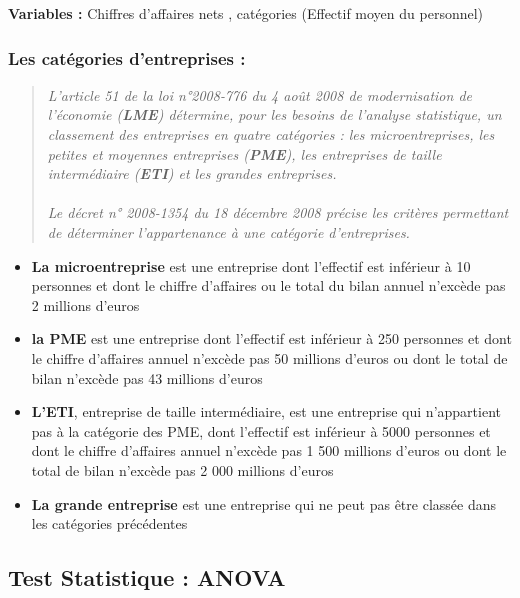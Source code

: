 \documentclass[mstat,12pt]{unswthesis}
\begin{document}
\textbf{Variables :} Chiffres d'affaires nets , catégories (Effectif
moyen du personnel)

\subsubsection{Les catégories d'entreprises
:}\label{les-catuxe9gories-dentreprises}

\bigskip
\scriptsize
\begin{quote}
\textit{L’article 51 de la loi n°2008-776 du 4 août 2008 de modernisation de l’économie (\textbf{LME}) détermine, pour les besoins de l’analyse statistique, un classement des entreprises en quatre catégories : les microentreprises, les petites et moyennes entreprises (\textbf{PME}), les entreprises de taille intermédiaire (\textbf{ETI}) et les grandes entreprises.\\ \\Le décret n° 2008-1354 du 18 décembre 2008 précise les critères permettant de déterminer l’appartenance à une catégorie d'entreprises.}
\end{quote}
\normalsize

\begin{itemize}[label=$\circ$]
  \item \textnormal{ \textbf{La microentreprise} est une entreprise dont l'effectif est inférieur à 10 personnes et dont le chiffre d'affaires ou le total du bilan annuel n'excède pas 2 millions d'euros}
\item \textnormal{ \textbf{la PME} est une entreprise dont l’effectif est inférieur à 250 personnes
et dont le chiffre d’affaires annuel n'excède pas 50 millions d'euros ou
dont le total de bilan n'excède pas 43 millions d'euros }
\item \textnormal{\textbf{L'ETI}, entreprise de taille intermédiaire, est une entreprise qui n'appartient pas à la catégorie des PME, dont l’effectif est inférieur à 5000 personnes et dont le chiffre d'affaires annuel n'excède pas 1 500 millions d'euros ou dont le total de bilan n'excède pas 2 000 millions d'euros}
\item \textnormal{\textbf{La grande entreprise} est une entreprise qui ne peut pas être classée
dans les catégories précédentes}
\end{itemize}

\newpage

\subsection{Test Statistique : ANOVA}\label{test-statistique-anova}
\end{document}

